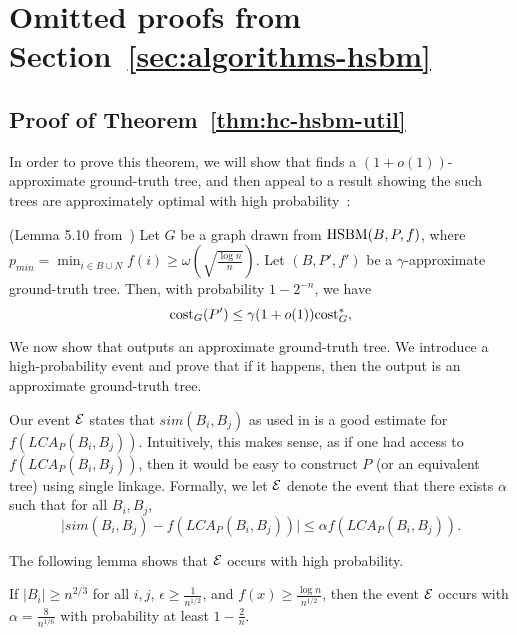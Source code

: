 \section{Omitted proofs from Section~\ref{sec:algorithms-hsbm}}

\subsection{Proof of Theorem~\ref{thm:hc-hsbm-util}}\label{sec:hc-hsbm-util}

In order to prove this theorem, we will show that \dphcblocks{} finds a $(1+o(1))$-approximate ground-truth tree, and then appeal to a result showing the such trees are approximately optimal with high probability~\citep{cohen2019hierarchical}:

\begin{lem}\label{lem:approx-hsbm-tree-opt} (Lemma 5.10 from~\citet{cohen2019hierarchical})
Let $G$ be a graph drawn from $\textnormal{HSBM}(B,P,f)$,  where $p_{min} = \min_{i \in B \cup N} f(i) \geq \omega(\sqrt{\frac{\log n}{n}})$. Let $(B,P',f')$ be a $\gamma$-approximate ground-truth tree. Then, with probability $1-2^{-n}$, we have
\[
    \textnormal{cost}_G(P') \leq \gamma (1 + o(1)) \textnormal{cost}_G^*,
\]
\end{lem}

We now show that \dphcblocks{} outputs an approximate ground-truth tree.
We introduce a high-probability event and prove that if it happens, then the output is an approximate ground-truth tree.

Our event $\mathcal{E}$ states that $sim(B_i, B_j)$ as used in \dphcblocks{} is a good estimate for $f(LCA_P(B_i, B_j))$. Intuitively, this makes sense, as if one had access to $f(LCA_P(B_i, B_j))$, then it would be easy to construct $P$ (or an equivalent tree) using single linkage. Formally, we let $\mathcal{E}$ denote the event that there exists $\alpha$ such that for all $B_i, B_j$,
\begin{equation}\label{eq:good-event}
    \big|sim(B_i, B_j) - f(LCA_P(B_i, B_j))\big| \leq \alpha f(LCA_P(B_i, B_j)).
\end{equation}

The following lemma shows that $\mathcal{E}$ occurs with high probability.
\begin{lem}\label{lem:good-event}
If $|B_i| \geq n^{2/3}$ for all $i, j$, $\epsilon \geq \frac{1}{n^{1/2}}$, and $f(x) \geq \frac{\log n}{n^{1/2}}$, then the event $\mathcal{E}$ occurs with $\alpha = \frac{8}{n^{1/6}}$ with probability at least $1-\frac{2}{n}$.
\end{lem}

